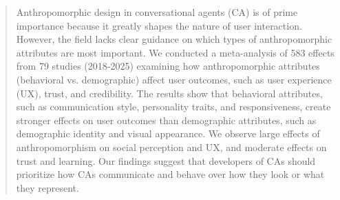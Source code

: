 \documentclass[manuscript,anonymous,sigconf]{acmart}
\begin{document}

\begin{abstract}

Anthropomorphic design in conversational agents (CA) is of prime importance because it greatly shapes the nature of user interaction. However, the field lacks clear guidance on which types of anthropomorphic attributes are most important. We conducted a meta-analysis of 583 effects from 79 studies (2018-2025) examining how anthropomorphic attributes (behavioral vs. demographic) affect user outcomes, such as user experience (UX), trust, and credibility. The results show that behavioral attributes, such as communication style, personality traits, and responsiveness, create stronger effects on user outcomes than demographic attributes, such as demographic identity and visual appearance. We observe large effects of anthropomorphism on social perception and UX, and moderate effects on trust and learning. Our findings suggest that developers of CAs should prioritize how CAs communicate and behave over how they look or what they represent.

\end{abstract}


\end{document}
